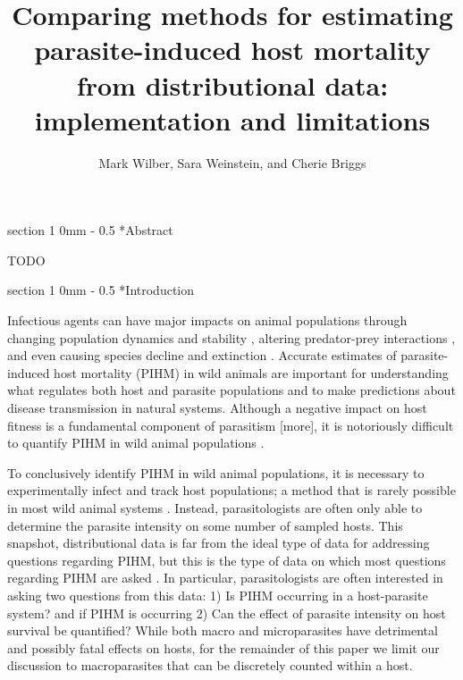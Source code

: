 \documentclass[12pt, a4paper]{article}
\title{Comparing methods for estimating parasite-induced host mortality from distributional data: implementation and limitations}
\author{Mark Wilber, Sara Weinstein, and Cherie Briggs}
\makeatletter
\renewcommand{\section}{\@startsection
{section}%
{1}%
{0mm}%
{-\baselineskip}%
{0.5\baselineskip}%
{\normalfont\bf\large}} %
\makeatother
\begin{document}
\maketitle

\section*{Abstract}

TODO

\doublespacing

\linenumbers
\section*{Introduction}

Infectious agents can have major impacts on animal populations
through changing population dynamics and stability \citep{Dobson1992}, altering
predator-prey interactions \citep{Joly2004}, and even causing species decline
and extinction \citep{DeCastro2005a,McCallum2012b}. Accurate estimates of
parasite-induced host mortality (PIHM) in wild animals are important for
understanding what regulates both host and parasite populations and to make
predictions about disease transmission in natural systems. Although a negative
impact on host fitness is a fundamental component of parasitism
\citep{Lafferty2002} [more], it is notoriously difficult to quantify PIHM in
wild animal populations \citep{Lester1984,McCallum2000a}.

To conclusively identify PIHM in wild animal populations, it is necessary to
experimentally infect and track host populations; a method that is rarely
possible in most wild animal systems \citep{McCallum2000a}.  Instead, parasitologists
are often only able to determine the parasite intensity on some number of sampled hosts.  This snapshot, distributional data is far from the
ideal type of data for addressing questions regarding PIHM, but this is the type of data on which most questions regarding PIHM are asked \citep{Ferguson2011,Royce1990,Lanciani1989,Lester1984,Lester1977}.  In particular, parasitologists are often interested in asking two questions from this data: 1) Is PIHM occurring in a host-parasite system? and if PIHM is occurring 2) Can the effect of parasite intensity on host survival be quantified? While both macro and
microparasites have detrimental and possibly fatal effects on hosts, for the
remainder of this paper we limit our discussion to macroparasites that can be
discretely counted within a host.
\end{document}
